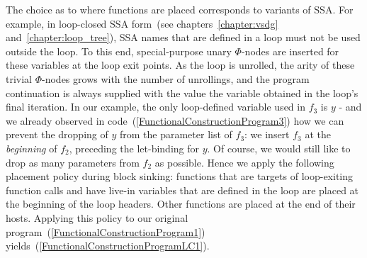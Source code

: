 The choice as to where functions are placed corresponds to variants of
SSA. For example, in loop-closed SSA form~(see
chapters~\ref{chapter:vsdg} and~\ref{chapter:loop_tree}), SSA names that
are defined in a loop must not be used outside the loop. To this end,
special-purpose unary $\Phi$-nodes are inserted for these variables at
the loop exit points. As the loop is unrolled, the arity of these
trivial $\Phi$-nodes grows with the number of unrollings, and the
program continuation is always supplied with the value the variable
obtained in the loop's final iteration.  In our example, the only
loop-defined variable used in $f_3$ is $y$ - and we already observed
in code~(\ref{FunctionalConstructionProgram3}) how we can prevent the
dropping of $y$ from the parameter list of $f_3$: we insert $f_3$ at
the \emph{beginning} of $f_2$, preceding the let-binding for $y$. Of
course, we would still like to drop as many parameters from $f_2$ as
possible. Hence we apply the following placement policy during block
sinking: functions that are targets of loop-exiting function calls and
have live-in variables that are defined in the loop are placed at the
beginning of the loop headers.  Other functions are placed at the end
of their hosts. Applying this policy to our original
program~(\ref{FunctionalConstructionProgram1})
yields~(\ref{FunctionalConstructionProgramLC1}).
